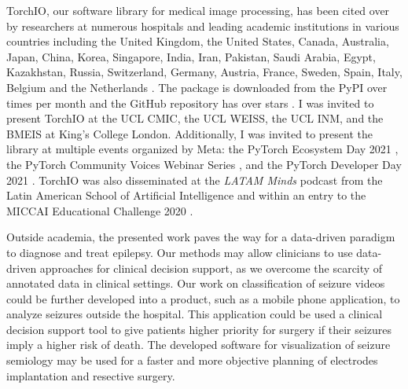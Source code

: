 TorchIO, our software library for medical image processing,
has been cited over \torchiocitations by researchers
at numerous hospitals and leading academic institutions in various countries including
the United Kingdom, the United States, Canada, Australia, Japan, China, Korea, Singapore, India, Iran, Pakistan, Saudi Arabia, Egypt, Kazakhstan, Russia, Switzerland, Germany, Austria, France, Sweden, Spain, Italy, Belgium and the Netherlands%
.
The package is downloaded from the \ac{PyPI} over \torchiomonthdownloads times per month%
%
and the GitHub repository has over \torchiostars stars%
.
I was invited to present TorchIO at
the UCL \ac{CMIC},
the UCL \ac{WEISS},
the UCL \ac{INM}, and
the \ac{BMEIS} at King's College London.
Additionally, I was invited to present the library at multiple events organized by Meta: the PyTorch Ecosystem Day 2021%
,
the PyTorch Community Voices Webinar Series%
,
and the PyTorch Developer Day 2021%
.
TorchIO was also disseminated at the \textit{LATAM Minds} podcast from the Latin American School of Artificial Intelligence%
and within an entry to the MICCAI Educational Challenge 2020%
.

Outside academia, the presented work paves the way for a data-driven paradigm to diagnose and treat epilepsy.
Our methods may allow clinicians to use data-driven approaches for clinical decision support, as we overcome the scarcity of annotated data in clinical settings.
Our work on classification of seizure videos could be further developed into a product, such as a mobile phone application, to analyze seizures outside the hospital.
This application could be used a clinical decision support tool to give patients higher priority for surgery if their seizures imply a higher risk of death.
The developed software for visualization of seizure semiology may be used for a faster and more objective planning of electrodes implantation and resective surgery.




